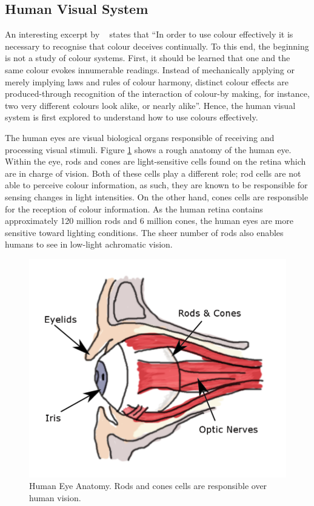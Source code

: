 \vspace{1em}
\subsection{Human Visual System}
An interesting excerpt by ~ states that ``In order to use colour effectively it is necessary to recognise that colour deceives continually. To this end, the beginning is not a study of colour systems.
First, it should be learned that one and the same colour evokes innumerable readings. Instead of mechanically applying or merely implying laws and rules of colour harmony, distinct colour effects are produced-through recognition of the interaction of colour-by making, for instance, two very different colours look alike, or nearly alike''. Hence, the human visual system is first explored to understand how to use colours effectively.

\label{section:eyes}
The human eyes are visual biological organs responsible of receiving and
processing visual stimuli. Figure \ref{fig:eyes} shows a rough anatomy of
the human eye. Within the eye, rods and cones are light-sensitive cells
found on the retina which are in charge of vision. Both of these cells play
a different role; rod cells are not able to perceive colour information, as such, they are known to be responsible for sensing changes in light intensities.
On the other hand, cones cells are responsible for the reception of colour
information. As the human retina contains approximately 120 million rods and
6 million cones, the human eyes are more sensitive toward lighting conditions.
The sheer number of rods also enables humans to see in low-light achromatic
vision.


\begin{figure}[hbt!]\centering
 \includegraphics[width=.5\textwidth]{image/lit/rodsandconscolored.png}
 \caption[Human Eye Anatomy]{Human Eye Anatomy. Rods and cones cells are
 responsible over human vision. %
 }
 \label{fig:eyes}
\end{figure}

